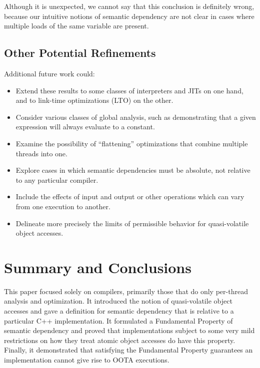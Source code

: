 Although it is unexpected, we cannot say that this conclusion is
definitely wrong, because our intuitive notions of semantic
dependency are not clear in cases where multiple loads of the same
variable are present.

\subsection{Other Potential Refinements}
\label{sec:Other Potential Refinements}

Additional future work could:
\begin{itemize}
\item	Extend these results to some classes of interpreters and JITs
	on one hand, and to link-time optimizations (LTO) on the other.
\item	Consider various classes of global analysis, such as
	demonstrating that a given expression will always evaluate
	to a constant.
\item	Examine the possibility of ``flattening'' optimizations that
	combine multiple threads into one.
\item	Explore cases in which semantic dependencies must be absolute,
	not relative to any particular compiler.
\item	Include the effects of input and output or other operations
	which can vary from one execution to another.
\item	Delineate more precisely the limits of permissible behavior
	for quasi-volatile object accesses.
\end{itemize}

\section{Summary and Conclusions}
\label{sec:Summary and Conclusions}

This paper focused solely on compilers, primarily those that do only
per-thread analysis and optimization.
It introduced the notion of quasi-volatile object accesses and gave
a definition for semantic dependency that is relative to a particular
C++ implementation.
It formulated a Fundamental Property of semantic dependency and proved
that implementations subject to some very mild restrictions on how
they treat atomic object accesses do have this property.
Finally, it demonstrated that satisfying the Fundamental Property
guarantees an implementation cannot give rise to OOTA executions.

